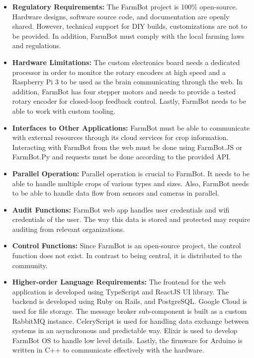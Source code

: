 \begin{itemize}
    \item \textbf{Regulatory Requirements:} {The FarmBot project is 100\% open-source. Hardware designs, software source code, and documentation are openly shared. However, technical support for DIY builds, customizations are not to be provided. In addition, FarmBot must comply with the local farming laws and regulations.}
    \item \textbf{Hardware Limitations:} {The custom electronics board needs a dedicated processor in order to monitor the rotary encoders at high speed and a Raspberry Pi 3 to be used as the brain communicating through the web. In addition, FarmBot has four stepper motors and needs to provide a tested rotary encoder for closed-loop feedback control. Lastly, FarmBot needs to be able to work with custom tooling.}
    \item \textbf{Interfaces to Other Applications:} {FarmBot must be able to communicate with external resources through its cloud services for crop information. Interacting with FarmBot from the web must be done using FarmBot.JS or FarmBot.Py and requests must be done according to the provided API.}
    \item \textbf{Parallel Operation:} {Parallel operation is crucial to FarmBot. It needs to be able to handle multiple crops of various types and sizes. Also, FarmBot needs to be able to handle data flow from sensors and cameras in parallel.}
    \item \textbf{Audit Functions:} {FarmBot web app handles user credentials and wifi credentials of the user. The way this data is stored and protected may require auditing from relevant organizations.}
    \item \textbf{Control Functions:} {Since FarmBot is an open-source project, the control function does not exist. In contrast to being central, it is distributed to the community.}
    \item \textbf{Higher-order Language Requirements:} {The frontend for the web application is developed using TypeScript and ReactJS UI library. The backend is developed using Ruby on Rails, and PostgreSQL. Google Cloud is used for file storage. The message broker sub-component is built as a custom RabbitMQ instance. CeleryScript is used for handling data exchange between systems in an asynchronous and predictable way. Elixir is used to develop FarmBot OS to handle low level details. Lastly, the firmware for Arduino is written in C++ to communicate effectively with the hardware.}

\end{itemize}
